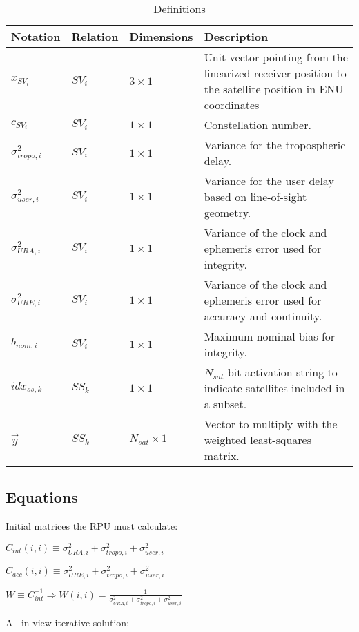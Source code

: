 \documentclass[11pt]{article}
\begin{document}
\begin{table}[htbp] \centering
  \caption{Definitions}
  \begin{tabular}{|m{2cm}|m{2cm}|m{2cm}|m{7cm}|}
    \hline
    \textbf{Notation} & \textbf{Relation} & \textbf{Dimensions} & \textbf{Description}\\ \hline
    $x_{SV_i}$ & $SV_i$ & $3 \times 1$ & Unit vector pointing from the linearized receiver position to the satellite position in ENU coordinates\\ \hline
    $c_{SV_i}$ & $SV_i$ & $1 \times 1$ & Constellation number.\\ \hline
    $\sigma_{tropo,i}^2$ & $SV_i$ & $1 \times 1$ & Variance for the tropospheric delay.\\ \hline
    $\sigma_{user,i}^2$ & $SV_i$ & $1 \times 1$ & Variance for the user delay based on line-of-sight geometry.\\ \hline
    $\sigma_{URA,i}^2$ & $SV_i$ & $1 \times 1$ & Variance of the clock and ephemeris error used for integrity.\\ \hline
    $\sigma_{URE,i}^2$ & $SV_i$ & $1 \times 1$ & Variance of the clock and ephemeris error used for accuracy and continuity.\\ \hline
    $b_{nom,i}$ & $SV_i$ & $1 \times 1$ & Maximum nominal bias for integrity.\\ \hline
    $idx_{ss,k}$ & $SS_k$ & $1 \times 1$ & $N_{sat}$-bit activation string to indicate satellites included in a subset.\\ \hline
    $\vec{y}$ & $SS_k$ & $N_{sat} \times 1$ & Vector to multiply with the weighted least-squares matrix.\\ \hline
  \end{tabular}
\end{table}

\subsection{Equations}

Initial matrices the RPU must calculate:

$C_{int}(i,i) \equiv \sigma_{URA,i}^2 + \sigma_{tropo,i}^2 + \sigma_{user,i}^2$

$C_{acc}(i,i) \equiv \sigma_{URE,i}^2 + \sigma_{tropo,i}^2 + \sigma_{user,i}^2$

$W \equiv C_{int}^{-1} \Rightarrow W(i,i)=\frac{1}{\sigma_{URA,i}^2 + \sigma_{tropo,i}^2 + \sigma_{user,i}^2}$

All-in-view iterative solution:
\end{document}
